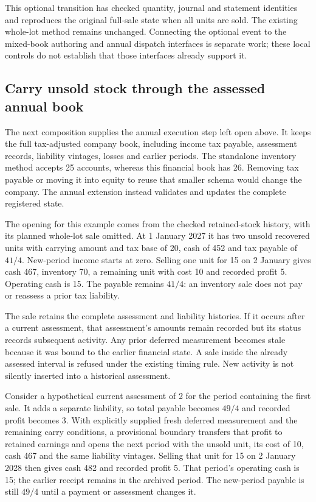 This optional transition has checked quantity, journal and statement identities
and reproduces the original full-sale state when all units are sold. The
existing whole-lot method remains unchanged. Connecting the optional event to
the mixed-book authoring and annual dispatch interfaces is separate work;
these local controls do not establish that those interfaces already support it.

\subsection{Carry unsold stock through the assessed annual book}
The next composition supplies the annual execution step left open above. It
keeps the full tax-adjusted company book, including income tax payable,
assessment records, liability vintages, losses and earlier periods. The
standalone inventory method accepts 25 accounts, whereas this financial book
has 26. Removing tax payable or moving it into equity to reuse that smaller
schema would change the company. The annual extension instead validates and
updates the complete registered state.

The opening for this example comes from the checked retained-stock history,
with its planned whole-lot sale omitted. At 1 January 2027 it has two unsold
recovered units with carrying amount and tax base of 20, cash of 452 and tax
payable of $41/4$. New-period income starts at zero. Selling one unit for 15
on 2 January gives cash 467, inventory 70, a remaining unit with cost 10 and
recorded profit 5. Operating cash is 15. The payable remains $41/4$: an
inventory sale does not pay or reassess a prior tax liability.

The sale retains the complete assessment and liability histories. If it occurs
after a current assessment, that assessment's amounts remain recorded but its
status records subsequent activity. Any prior deferred measurement becomes
stale because it was bound to the earlier financial state. A sale inside the
already assessed interval is refused under the existing timing rule. New
activity is not silently inserted into a historical assessment.

Consider a hypothetical current assessment of 2 for the period containing the
first sale. It adds a separate liability, so total payable becomes $49/4$ and
recorded profit becomes 3. With explicitly supplied fresh deferred measurement
and the remaining carry conditions, a provisional boundary transfers that
profit to retained earnings and opens the next period with the unsold unit,
its cost of 10, cash 467 and the same liability vintages. Selling that unit for
15 on 2 January 2028 then gives cash 482 and recorded profit 5. That period's
operating cash is 15; the earlier receipt remains in the archived period.
The new-period payable is still $49/4$ until a payment or assessment changes it.

